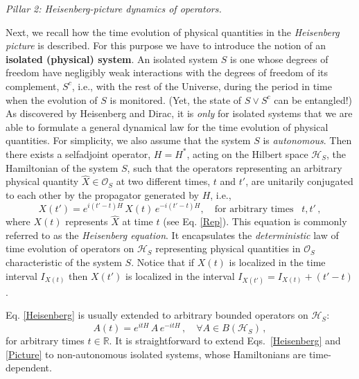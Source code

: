 \documentclass[12pt]{article}
\begin{document}
\textit{{Pillar 2}: Heisenberg-picture dynamics of operators.}

Next, we recall how the time evolution of physical quantities in the \textit{Heisenberg picture} is described.
For this purpose we have to introduce the notion of an {\bf{isolated (physical) system}}.
An isolated system $S$ is one whose degrees of freedom have negligibly weak interactions with the
degrees of freedom of its complement, $S^{c}$, i.e., with the rest of the Universe, during the period in
time when the evolution of $S$ is monitored. (Yet, the state of $S\vee S^{c}$ can be entangled!)
As discovered by {Heisenberg} and Dirac, it is \textit{only} for isolated systems that we are
able to formulate a general dynamical law for the time evolution of physical quantities. For simplicity, we also assume that the
system $S$ is \textit{autonomous}. Then there exists a selfadjoint operator, $H=H^{*}$,
acting on the Hilbert space $\mathcal{H}_S$, the {Hamiltonian} of the system $S$, such that the operators representing an arbitrary physical quantity $\hat{X}\in \mathcal{O}_S$ at two different times, $t$ and $t'$, are unitarily conjugated to each other by the propagator generated by $H$, i.e.,
\begin{equation}\label{Heisenberg}
X(t') = e^{i(t'-t)H} \,X(t) \,e^{-i(t'-t)H}, \quad \text{for arbitrary times }\,\,\, t, t'\,,
\end{equation}
where $X(t)$ represents $\hat{X}$ at time $t$ (see Eq. \eqref{Rep}). This equation is
commonly referred to as the \textit{Heisenberg equation}. It encapsulates the \textit{deterministic} law of time evolution of
operators on $\mathcal{H}_S$ representing physical quantities in $\mathcal{O}_S$ characteristic of the system $S$.
Notice that if $X(t)$ is localized in the time interval $I_{X(t)}$ then $X(t')$ is localized in the interval $I_{X(t')}= I_{X(t)} +(t'-t)$.

Eq. \eqref{Heisenberg} is usually extended to arbitrary bounded operators on $\mathcal{H}_S$:
\begin{equation}\label{Picture}
A(t) = e^{itH} \, A \, e^{-itH}\,, \quad \forall A \in B(\mathcal{H}_S)\,,
\end{equation}
for arbitrary times $t \in \mathbb{R}$. It is straightforward to extend Eqs.~\eqref{Heisenberg} and \eqref{Picture} to
non-autonomous isolated systems, whose Hamiltonians are time-dependent.
\end{document}
